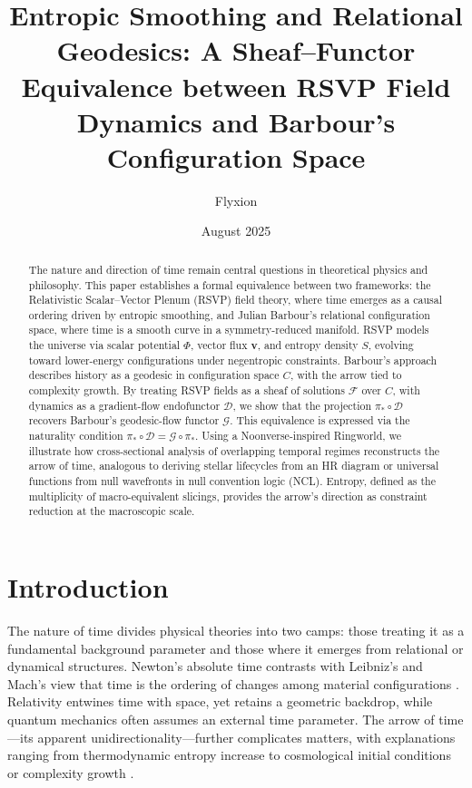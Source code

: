 \documentclass[11pt]{article}
\title{Entropic Smoothing and Relational Geodesics: A Sheaf--Functor Equivalence between RSVP Field Dynamics and Barbour's Configuration Space}
\author{Flyxion}
\date{August 2025}
\theoremstyle{plain}
\theoremstyle{definition}
\begin{document}
\maketitle

\begin{abstract}
The nature and direction of time remain central questions in theoretical physics and philosophy. This paper establishes a formal equivalence between two frameworks: the Relativistic Scalar--Vector Plenum (RSVP) field theory, where time emerges as a causal ordering driven by entropic smoothing, and Julian Barbour’s relational configuration space, where time is a smooth curve in a symmetry-reduced manifold. RSVP models the universe via scalar potential $\Phi$, vector flux $\mathbf{v}$, and entropy density $S$, evolving toward lower-energy configurations under negentropic constraints. Barbour’s approach describes history as a geodesic in configuration space $C$, with the arrow tied to complexity growth. By treating RSVP fields as a sheaf of solutions $\mathscr{F}$ over $C$, with dynamics as a gradient-flow endofunctor $\mathcal{D}$, we show that the projection $\pi_* \circ \mathcal{D}$ recovers Barbour’s geodesic-flow functor $\mathcal{G}$. This equivalence is expressed via the naturality condition $\pi_* \circ \mathcal{D} = \mathcal{G} \circ \pi_*$. Using a Noonverse-inspired Ringworld, we illustrate how cross-sectional analysis of overlapping temporal regimes reconstructs the arrow of time, analogous to deriving stellar lifecycles from an HR diagram or universal functions from null wavefronts in null convention logic (NCL). Entropy, defined as the multiplicity of macro-equivalent slicings, provides the arrow’s direction as constraint reduction at the macroscopic scale.
\end{abstract}

\tableofcontents

\section{Introduction}

The nature of time divides physical theories into two camps: those treating it as a fundamental background parameter and those where it emerges from relational or dynamical structures. Newton’s absolute time contrasts with Leibniz’s and Mach’s view that time is the ordering of changes among material configurations \citep{Barbour1999}. Relativity entwines time with space, yet retains a geometric backdrop, while quantum mechanics often assumes an external time parameter. The arrow of time—its apparent unidirectionality—further complicates matters, with explanations ranging from thermodynamic entropy increase \citep{Prigogine1997} to cosmological initial conditions \citep{Ellis2012} or complexity growth \citep{Barbour2014}.
\end{document}
